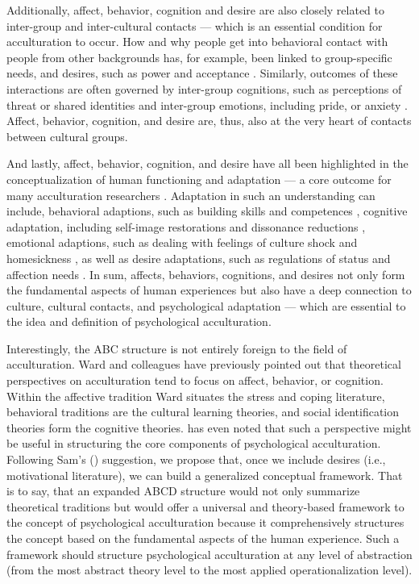 \documentclass[man, 12pt, a4paper, mask]{apa7}
\begin{document}
Additionally, affect, behavior, cognition and desire are also closely related to inter-group and inter-cultural contacts --- which is an essential condition for acculturation to occur. How and why people get into behavioral contact with people from other backgrounds has, for example, been linked to group-specific needs, and desires, such as power and acceptance \citep[e.g.,][]{Hassler2021, Shnabel2008a}. Similarly, outcomes of these interactions are often governed by inter-group cognitions, such as perceptions of threat or shared identities \citep[e.g.,][]{Dovidio2017, Stephan2000a} and inter-group emotions, including pride, or anxiety \citep[e.g.,][]{Iyer2008, Stephan1992}. Affect, behavior, cognition, and desire are, thus, also at the very heart of contacts between cultural groups.

And lastly, affect, behavior, cognition, and desire have all been highlighted in the conceptualization of human functioning and adaptation --- a core outcome for many acculturation researchers \citep[e.g., see][]{Berry2006a,Searle1990,Ward2001,Maertz2016}. Adaptation in such an understanding can include, behavioral adaptions, such as building skills and competences \citep[e.g.,][]{Bevan1965}, cognitive adaptation, including self-image restorations and dissonance reductions \citep[e.g.,][]{Czajkowska2017}, emotional adaptions, such as dealing with feelings of culture shock and homesickness \citep[e.g.,][]{Smith1990, VanTilburg1996}, as well as desire adaptations, such as regulations of status and affection needs \citep[e.g.,][]{Steverink2006}. In sum, affects, behaviors, cognitions, and desires not only form the fundamental aspects of human experiences but also have a deep connection to culture, cultural contacts, and psychological adaptation --- which are essential to the idea and definition of psychological acculturation.

Interestingly, the ABC structure is not entirely foreign to the field of acculturation. Ward and colleagues \citep{Ward2001, Masgoret2006, Ward2019} have previously pointed out that theoretical perspectives on acculturation tend to focus on affect, behavior, or cognition. Within the affective tradition Ward situates the stress and coping literature, behavioral traditions are the cultural learning theories, and social identification theories form the cognitive theories. \citet{Sam2006b} has even noted that such a perspective might be useful in structuring the core components of psychological acculturation. 
Following Sam's (\citeyear{Sam2006b}) suggestion, we propose that, once we include desires (i.e., motivational literature), we can build a generalized conceptual framework. That is to say, that an expanded ABCD structure would not only summarize theoretical traditions but would offer a universal and theory-based framework to the concept of psychological acculturation because it comprehensively structures the concept based on the fundamental aspects of the human experience. Such a framework should structure psychological acculturation at any level of abstraction (from the most abstract theory level to the most applied operationalization level).
\end{document}
